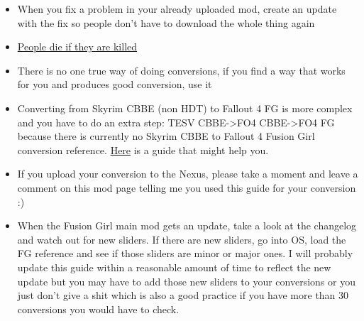 \begin{itemize}
    \item When you fix a problem in your already uploaded mod, create an update with the fix so people don't have to download the whole thing again
    \item \href{https://i3.kym-cdn.com/photos/images/original/000/070/976/PEOPLE_DIE_IF_THEY_ARE_KILLED.jpg}{People die if they are killed}
    \item There is no one true way of doing conversions, if you find a way that works for you and produces good conversion, use it
    \item Converting from Skyrim CBBE (non HDT) to Fallout 4 FG is more complex and you have to do an extra step: TESV CBBE->FO4 CBBE->FO4 FG 
    because there is currently no Skyrim CBBE to Fallout 4 Fusion Girl conversion reference. \href{https://www.nexusmods.com/fallout4/mods/21111}{Here} 
    is a guide that might help you.
    \item If you upload your conversion to the Nexus, please take a moment and leave a comment on this mod page telling me you used this guide for your conversion :)
    \item When the Fusion Girl main mod gets an update, take a look at the changelog and watch out for new sliders. If there are new sliders, go into OS, load the FG reference 
    and see if those sliders are minor or major ones. I will probably update this guide within a reasonable amount of time to reflect the new update but you may have to add 
    those new sliders to your conversions or you just don't give a shit which is also a good practice if you have more than 30 conversions you would have to check.
\end{itemize}